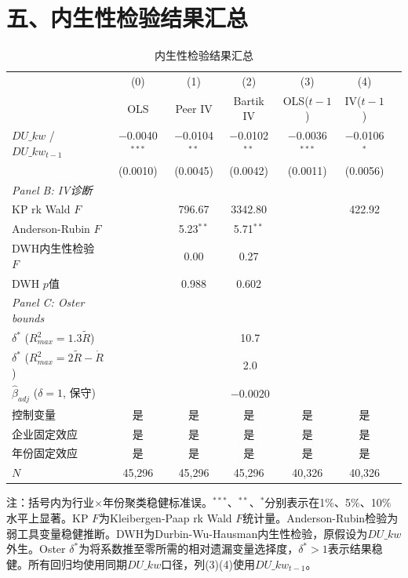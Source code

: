 \documentclass[11pt,a4paper]{article}
\begin{document}
\section*{五、内生性检验结果汇总}

\begin{table}[htbp]
\centering
\caption{内生性检验结果汇总}
\label{tab:iv}
\vspace{6pt}
\begin{tabular}{lcccccc}
\toprule
& (0) & (1) & (2) & (3) & (4) \\
& OLS & Peer IV & Bartik IV & OLS($t{-}1$) & IV($t{-}1$)\\
\midrule
$DU\_kw$ / $DU\_kw_{t-1}$ & $-$0.0040$^{***}$ & $-$0.0104$^{**}$ & $-$0.0102$^{**}$ & $-$0.0036$^{***}$ & $-$0.0106$^{*}$\\
& (0.0010) & (0.0045) & (0.0042) & (0.0011) & (0.0056) \\[6pt]
\textit{Panel B: IV诊断} \\[3pt]
KP rk Wald $F$ & & 796.67 & 3342.80 & & 422.92 \\
Anderson-Rubin $F$ & & 5.23$^{**}$ & 5.71$^{**}$ & & \\
DWH内生性检验 $F$ & & 0.00 & 0.27 & & \\
DWH $p$值 & & 0.988 & 0.602 & & \\[3pt]
\textit{Panel C: Oster bounds} \\[3pt]
$\delta^*$ ($R^2_{max}=1.3\tilde{R}$) & \multicolumn{5}{c}{10.7} \\
$\delta^*$ ($R^2_{max}=2\tilde{R}-\dot{R}$) & \multicolumn{5}{c}{2.0} \\
$\hat{\beta}_{adj}$ ($\delta=1$, 保守) & \multicolumn{5}{c}{$-$0.0020} \\[3pt]
\midrule
控制变量 & 是 & 是 & 是 & 是 & 是 \\
企业固定效应 & 是 & 是 & 是 & 是 & 是 \\
年份固定效应 & 是 & 是 & 是 & 是 & 是 \\
$N$ & 45,296 & 45,296 & 45,296 & 40,326 & 40,326 \\
\bottomrule
\end{tabular}

\vspace{6pt}
{\small 注：括号内为行业$\times$年份聚类稳健标准误。$^{***}$、$^{**}$、$^{*}$分别表示在1\%、5\%、10\%水平上显著。KP $F$为Kleibergen-Paap rk Wald $F$统计量。Anderson-Rubin检验为弱工具变量稳健推断。DWH为Durbin-Wu-Hausman内生性检验，原假设为$DU\_kw$外生。Oster $\delta^*$为将系数推至零所需的相对遗漏变量选择度，$\delta^*>1$表示结果稳健。所有回归均使用同期$DU\_kw$口径，列(3)(4)使用$DU\_kw_{t-1}$。}
\end{table}
\end{document}
